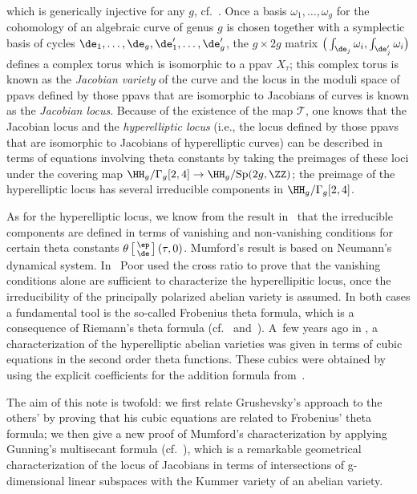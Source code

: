 which is generically injective for any $g$, cf.~\cite{SM}. Once a basis $\omega_1, \dots , \omega_g$ for the cohomology of an algebraic curve of genus $g$ is chosen together with a symplectic basis of cycles $\de_1, \dots , \de_g, \de'_1, \dots, \de'_g$, the $g \times 2g$ matrix $\big(\int_{\de_j}\omega_i, \int_{\de'_j}\omega_i\big)$ defines a complex torus which is isomorphic to a ppav $X_{\tau}$; this complex torus is known as the {\it Jacobian variety} of the curve and the locus in the moduli space of ppavs defined by those ppavs that are isomorphic to Jacobians of curves is known as the {\it Jacobian locus}. Because of the existence of the map $\mathcal{T}$, one knows that the Jacobian locus and the {\it hyperelliptic locus} (i.e., the locus defined by those ppavs that are isomorphic to Jacobians of hyperelliptic curves) can be described in terms of equations involving theta constants by taking the preimages of these loci under the covering map $\HH_g /\Gamma_g[2,4] \to \HH_g /{\rm Sp}(2g, \ZZ)$; the preimage of the hyperelliptic locus has several irreducible components in $\HH_g /\Gamma_g[2,4]$.

As for the hyperelliptic locus, we know from the result in~\cite{mu} that the irreducible components are defined in terms of vanishing and non-vanishing conditions for certain theta constants $\theta\left[\begin{smallmatrix}\ep \\ \de \end{smallmatrix}\right] (\tau,0)$. Mumford's result is based on Neumann's dynamical system. In~\cite{po} Poor used the cross ratio to prove that the vanishing conditions alone are sufficient to characterize the hyperellipitic locus, once the irreducibility of the principally polarized abelian variety is assumed. In both cases a fundamental tool is the so-called Frobenius theta formula, which is a consequence of Riemann's theta formula (cf.~\cite{FR} and~\cite{mu}). A~few years ago in \cite{Gr}, a characterization of the hyperelliptic abelian varieties was given in terms of cubic equations in the second order theta functions. These cubics were obtained by using the explicit coefficients for the addition formula from~\cite{BK2}.

The aim of this note is twofold: we first relate Grushevsky's approach to the others' by proving that his cubic equations are related to Frobenius' theta formula; we then give a new proof of Mumford's characterization by applying Gunning's multisecant formula (cf.~\cite{Gu}), which is a remarkable geometrical characterization of the locus of Jacobians in terms of intersections of g-dimensional linear subspaces with the Kummer variety of an abelian variety.

